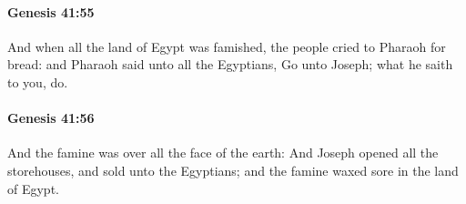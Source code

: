		\paragraph{Genesis 41:55} %
			\label{GENESIS-41-55}

			And when all the land of Egypt was famished, the people cried to Pharaoh for bread: and Pharaoh said unto all the Egyptians, Go unto Joseph; what he saith to you, do.


		\paragraph{Genesis 41:56} %
			\label{GENESIS-41-56}

			And the famine was over all the face of the earth: And Joseph opened all the storehouses, and sold unto the Egyptians; and the famine waxed sore in the land of Egypt.


